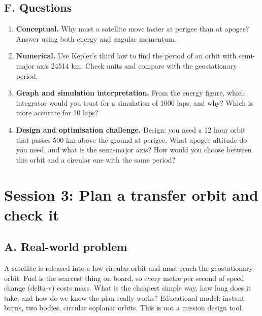 \documentclass[11pt,a4paper]{article}
\begin{document}
\subsection*{F. Questions}
\begin{enumerate}[nosep]
\item \textbf{Conceptual.} Why must a satellite move faster at perigee than at apogee? Answer using both energy and angular momentum.
\item \textbf{Numerical.} Use Kepler's third law to find the period of an orbit with semi-major axis 24514 km. Check units and compare with the geostationary period.
\item \textbf{Graph and simulation interpretation.} From the energy figure, which integrator would you trust for a simulation of 1000 laps, and why? Which is more accurate for 10 laps?
\item \textbf{Design and optimisation challenge.} Design: you need a 12 hour orbit that passes 500 km above the ground at perigee. What apogee altitude do you need, and what is the semi-major axis? How would you choose between this orbit and a circular one with the same period?
\end{enumerate}

\section{Session 3: Plan a transfer orbit and check it}

\subsection*{A. Real-world problem}
A satellite is released into a low circular orbit and must reach the geostationary orbit. Fuel is the scarcest thing on board, so every metre per second of speed change (delta-v) costs mass. What is the cheapest simple way, how long does it take, and how do we know the plan really works? Educational model: instant burns, two bodies, circular coplanar orbits. This is not a mission design tool.
\end{document}
